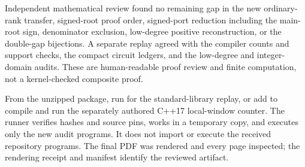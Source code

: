 Independent mathematical review found no remaining gap in the new ordinary-rank transfer, signed-root proof order, signed-port reduction including the main-root sign, denominator exclusion, low-degree positive reconstruction, or the double-gap bijections. A separate replay agreed with the compiler counts and support checks, the compact circuit ledgers, and the low-degree and integer-domain audits. These are human-readable proof review and finite computation, not a kernel-checked composite proof.

From the unzipped package, run  for the standard-library replay, or add  to compile and run the separately authored C++17 local-window counter. The runner verifies hashes and source pins, works in a temporary copy, and executes only the new audit programs. It does not import or execute the received repository programs. The final PDF was rendered and every page inspected; the rendering receipt and manifest identify the reviewed artifact.
